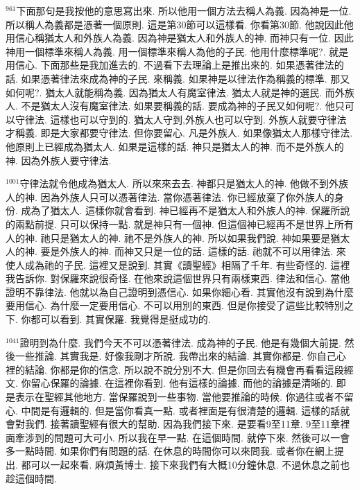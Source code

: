 \documentclass{book}
\begin{document}
$^{961}$下面那句是我按他的意思寫出來.
所以他用一個方法去稱人為義.
因為神是一位.
所以稱人為義都是憑著一個原則.
這是第30節可以這樣看.
你看第30節.
他說因此他用信心稱猶太人和外族人為義.
因為神是猶太人和外族人的神.
而神只有一位.
因此神用一個標準來稱人為義.
用一個標準來稱人為他的子民.
他用什麼標準呢?.
就是用信心.
下面那些是我加進去的.
不過看下去理論上是推出來的.
如果憑著律法的話.
如果憑著律法來成為神的子民.
來稱義.
如果神是以律法作為稱義的標準.
那又如何呢?.
猶太人就能稱為義.
因為猶太人有魔室律法.
猶太人就是神的選民.
而外族人.
不是猶太人沒有魔室律法.
如果要稱義的話.
要成為神的子民又如何呢?.
他只可以守律法.
這樣也可以守到的.
猶太人守到,外族人也可以守到.
外族人就要守律法才稱義.
即是大家都要守律法.
但你要留心.
凡是外族人.
如果像猶太人那樣守律法.
他原則上已經成為猶太人.
如果是這樣的話.
神只是猶太人的神.
而不是外族人的神.
因為外族人要守律法.

$^{1001}$守律法就令他成為猶太人.
所以來來去去.
神都只是猶太人的神.
他做不到外族人的神.
因為外族人只可以憑著律法.
當你憑著律法.
你已經放棄了你外族人的身份.
成為了猶太人.
這樣你就會看到.
神已經再不是猶太人和外族人的神.
保羅所說的兩點前提.
只可以保持一點.
就是神只有一個神.
但這個神已經再不是世界上所有人的神.
祂只是猶太人的神.
祂不是外族人的神.
所以如果我們說.
神如果要是猶太人的神.
要是外族人的神.
而神又只是一位的話.
這樣的話.
祂就不可以用律法.
來使人成為祂的子民.
這裡又是說到.
其實《讀聖經》相隔了千年.
有些奇怪的.
這裡我告訴你.
對保羅來說很奇怪.
在他來說這個世界只有兩樣東西.
律法和信心.
當他證明不靠律法.
他就以為自己證明到憑信心.
如果你細心看.
其實他沒有說到為什麼要用信心.
為什麼一定要用信心.
不可以用別的東西.
但是你接受了這些比較特別之下.
你都可以看到.
其實保羅.
我覺得是挺成功的.

$^{1041}$證明到為什麼.
我們今天不可以憑著律法.
成為神的子民.
他是有幾個大前提.
然後一些推論.
其實我是.
好像我剛才所說.
我帶出來的結論.
其實你都是.
你自己心裡的結論.
你都是你的信念.
所以說不說分別不大.
但是你回去有機會再看看這段經文.
你留心保羅的論據.
在這裡你看到.
他有這樣的論據.
而他的論據是清晰的.
即是表示在聖經其他地方.
當保羅說到一些事物.
當他要推論的時候.
你過往或者不留心.
中間是有邏輯的.
但是當你看真一點.
或者裡面是有很清楚的邏輯.
這樣的話就會對我們.
接著讀聖經有很大的幫助.
因為我們接下來.
是要看9至11章.
9至11章裡面牽涉到的問題可大可小.
所以我在早一點.
在這個時間.
就停下來.
然後可以一會多一點時間.
如果你們有問題的話.
在休息的時間你可以來問我.
或者你在網上提出.
都可以一起來看.
麻煩黃博士.
接下來我們有大概10分鐘休息.
不過休息之前也趁這個時間.
\end{document}

